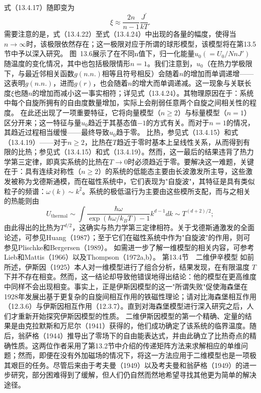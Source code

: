 式（13.4.17）随即变为
\begin{equation}\tag{13.1.81}\label{eq:13.1.81}
\xi \approx \frac { 2 n } { n - 1 } \frac { J ^{\prime} } { k T } .
\end{equation}
需要注意的是，式（13.4.22）至式（13.4.24）中出现的各量的幅度，使得当\(n \to \infty\)时，该极限依然存在；这一极限对应于所谓的球形模型，该模型将在第13.5节中予以深入研究。
图~13.6展示了在不同n值下，归一化能量\(u_{0}(=U_{0}/NnJ')\)随温度的变化情况，其中也包括极限情形\(n=1\)。我们注意到，\(u_{0}\)（在热力学极限下，与最近邻相关函数\(g(n.n.)\)相等且符号相反）会随着\(n\)的增加而单调递增——这表明\(g(n.n.)\)，进而\(g(r)\)，也会随着\(n\)的增大而单调递减。这一现象与关联长度\(\xi\)也随\(n\)的增加而减小这一事实相符；详见式（13.4.24）。其物理原因在于：系统中每个自旋所拥有的自由度数量增加，实际上会削弱任意两个自旋之间相关性的程度。
在此还出现了一项重要特征，它将向量模型（\(n \geq 2\)）与标量模型（\(n=1\)）区分开来；这一特征与量\(u_0\)趋近于其基态值\(-1\)的方式有关。而对于\(n=1\)的情况，其趋近过程相当缓慢——最终导致\(u_0\)趋于零。
比热，参见式（13.4.15）和式（13.4.19）——对于\(n \geq 2\)，比热在\(T\)趋近于零时基本上呈线性关系，从而得到有限的比热；参见式（13.4.15）和式（13.4.19）。然而，这一最后的结果违背了热力学第三定律，即真实系统的比热在\(T \rightarrow 0\)时必须趋近于零。要解决这一难题，关键在于：具有连续对称性（\(n \geq 2\)）的系统的低能态主要由长波激发所主导，这些激发被称为戈德斯通模，而在磁性系统中，它们表现为"自旋波"，其特征是具有类似粒子的频谱：\(\omega(k) \sim k^2\)。系统的极低温行为主要由这些模所支配，而与之相关的热能则由
\begin{equation}\tag{13.1.82}\label{eq:13.1.82}
U _ { \mathrm { t h e r m a l } } \sim \int \frac { \hbar \omega } { \exp ( \hbar \omega / k _ { B } T ) - 1 } k ^{d - 1} d k \sim T ^{( d + 2 ) / 2} ;
\end{equation}
由此得出的比热为\(T^{d/2}\)，这确实与热力学第三定律相符。关于戈德斯通激发的全面论述，可参见Huang（1987）；至于它们在磁性系统中作为"自旋波"的作用，则可参见Plischke和Bergersen（1989）。
如需进一步了解一维模型的相关内容，可参考Lieb和Mattis（1966）以及Thompson（1972a,b）。
第13.4节　二维伊辛模型
如前所述，伊斯因（1925）本人对一维模型进行了组合分析，结果发现，在有限温度 \(T\) 下并不存在相变。然而，这一结论却导致他错误地得出结论：他的模型在更高维度中同样不会出现相变。事实上，正是伊斯因模型的这一"所谓失败"促使海森堡在1928年发展出基于更复杂的自旋间相互作用的铁磁性理论；请对比海森堡相互作用（12.3.6）与伊斯因相互作用（12.3.7）。直到对海森堡模型进行深入研究之后，人们才重新开始探究伊斯因模型的性质。
二维伊斯因模型的第一个精确、定量的结果是由克拉默斯和万尼尔（1941）获得的，他们成功确定了该系统的临界温度。随后，翁萨格（1944）推导出了零场下的自由能表达式，并由此确立了比热奇点的精确性质。这两位作者采用了第13.2节中介绍的传递矩阵方法来求解相应的单维问题；然而，即便在没有外加磁场的情况下，将这一方法应用于二维模型也是一项极其艰巨的任务。尽管后来由于考夫曼（1949）以及考夫曼和翁萨格（1949）的进一步研究，部分困难得到了缓解，但人们仍自然而然地希望寻找其他更为简单的解决途径。

